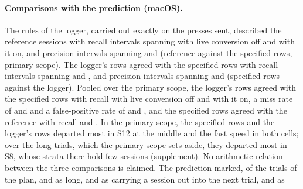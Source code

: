 \paragraph{Comparisons with the prediction (macOS).} The rules of the logger, carried out exactly on the presses sent,
described the reference sessions with recall intervals spanning 
with live conversion off and  with it on, and precision
intervals spanning  and
 (reference against the specified rows, primary scope). The
logger's rows agreed with the specified rows with recall intervals spanning
 and ,
and precision intervals spanning  and
 (specified rows against the logger). Pooled over the primary
scope, the logger's rows agreed with the specified rows with recall
 with live conversion off and
 with it on, a miss rate of
 and
 and a false-positive rate of
 and
, and the specified rows agreed with the reference
with recall  and
. In the primary scope, the specified rows and the logger's
rows departed most in S12 at the middle and the fast speed in both cells; over the long trials, which the primary scope
sets aside, they departed most in S8, whose strata there hold few sessions (supplement). No arithmetic relation
between the three comparisons is claimed. The prediction marked, of the trials of the plan,
and  as long,  and
 as carrying a session out into the next trial,
 and  as
